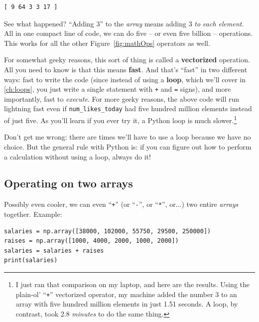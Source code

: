 \begin{Verbatim}[fontsize=\small,samepage=true,frame=leftline,framesep=5mm,framerule=1mm]
[ 9 64 3 3 17 ]
\end{Verbatim}

See what happened? ``Adding 3'' to the \textit{array} means adding 3 \textit{to
each element}. All in one compact line of code, we can do five -- or even five
billion -- operations. This works for all the other Figure~\ref{fig:mathOps}
operators as well.


For somewhat geeky reasons, this sort of thing is called a \textbf{vectorized}
operation. All you need to know is that this means \textbf{fast}. And that's
``fast'' in two different ways: fast to write the code (since instead of using
a \textbf{loop}, which we'll cover in \ref{ch:loops}, you just write a single
statement with \texttt{+} and \texttt{=} signs), and more importantly, fast to
\textit{execute}. For more geeky reasons, the above code will run lightning
fast even if \texttt{num\_likes\_today} had five hundred million elements
instead of just five. As you'll learn if you ever try it, a Python loop is much
slower.\footnote{I just ran that comparison on my laptop, and here are the
results. Using the plain-ol' ``\texttt{+}'' vectorized operator, my machine
added the number 3 to an array with five hundred million elements in just 1.51
seconds. A loop, by contrast, took 2.8 \textit{minutes} to do the same thing.}

Don't get me wrong: there are times we'll have to use a loop because we have no
choice. But the general rule with Python is: if you can figure out how to
perform a calculation without using a loop, always do it!


\subsection{Operating on two arrays}


Possibly even cooler, we can even ``\texttt{+}'' (or ``\texttt{-}'', or
``\texttt{*}'', or...) two entire \textit{arrays} together. Example:

\label{vectorizedArrayArrayExample}
\begin{Verbatim}[fontsize=\small,samepage=true,frame=single,framesep=3mm]
salaries = np.array([38000, 102000, 55750, 29500, 250000])
raises = np.array([1000, 4000, 2000, 1000, 2000])
salaries = salaries + raises
print(salaries)
\end{Verbatim}


